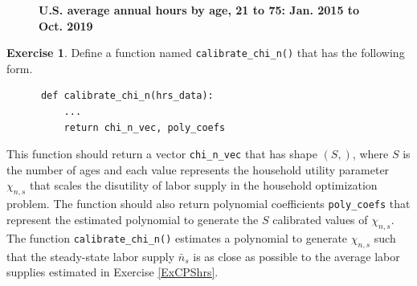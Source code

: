 \documentclass[letterpaper,12pt]{article}
\theoremstyle{definition}
\newtheorem{exercise}[theorem]{Exercise}
\begin{document}
  \begin{figure}[htb]\centering\captionsetup{width=4.0in}
    \caption{\textbf{U.S. average annual hours by age, 21 to 75: Jan. 2015 to Oct. 2019}}\label{FigHrsByAge_21to75}
  \end{figure}

  \begin{exercise}\label{ExChi_ns_fit}
    Define a function named \texttt{calibrate\_chi\_n()} that has the following form.
    \begin{lstlisting}
      def calibrate_chi_n(hrs_data):
          ...
          return chi_n_vec, poly_coefs
    \end{lstlisting}
    This function should return a vector \texttt{chi\_n\_vec} that has shape $(S,)$, where $S$ is the number of ages and each value represents the household utility parameter $\chi_{n,s}$ that scales the disutility of labor supply in the household optimization problem. The function should also return polynomial coefficients \texttt{poly\_coefs} that represent the estimated polynomial to generate the $S$ calibrated values of $\chi_{n,s}$. The function \texttt{calibrate\_chi\_n()} estimates a polynomial to generate $\chi_{n,s}$ such that the steady-state labor supply $\bar{n}_s$ is as close as possible to the average labor supplies estimated in Exercise \ref{ExCPShrs}.
  \end{exercise}



\end{document}
